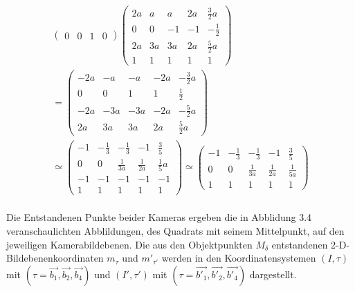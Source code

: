 \begin{gather}
\begin{pmatrix}
		0&0&1&0
	\end{pmatrix}
	\begin{pmatrix}
		2a&a&a&2a&\frac{3}{2}a\\
		0&0&-1&-1&-\frac{1}{2}\\
		2a&3a&3a&2a&\frac{5}{2}a\\
		1&1&1&1&1
	\end{pmatrix}\\=
	\begin{pmatrix}
		-2a&-a&-a&-2a&-\frac{3}{2}a\\
		0&0&1&1&\frac{1}{2}\\
		-2a&-3a&-3a&-2a&-\frac{5}{2}a\\
		2a&3a&3a&2a&\frac{5}{2}a
	\end{pmatrix}\\
	\simeq
	\begin{pmatrix}
		-1&-\frac{1}{3}&-\frac{1}{3}&-1&\frac{3}{5}\\
		0&0&\frac{1}{3a}&\frac{1}{2a}&\frac{1}{5}a\\
		-1&-1&-1&-1&-1\\
		1&1&1&1&1
	\end{pmatrix}
		\simeq
	\begin{pmatrix}
	-1&-\frac{1}{3}&-\frac{1}{3}&-1&\frac{3}{5}\\
	0&0&\frac{1}{3a}&\frac{1}{2a}&\frac{1}{5a}\\
	1&1&1&1&1
	\end{pmatrix}
\end{gather}\\

Die Entstandenen Punkte beider Kameras ergeben die in Abblidung 3.4 veranschaulichten Abblildungen, des Quadrats mit seinem Mittelpunkt, auf den jeweiligen Kamerabildebenen. Die aus den Objektpunkten $M_\delta$ entstandenen 2-D-Bildebenenkoordinaten $m_\tau$ und $m'_{\tau'}$ werden in den Koordinatensystemen $(I,\tau)$ mit $(\tau = \vec{b_1},\vec{b_2},\vec{b_4})$ und $(I',\tau')$ mit $(\tau = \vec{b'_1},\vec{b'_2},\vec{b'_4})$ dargestellt.\\

